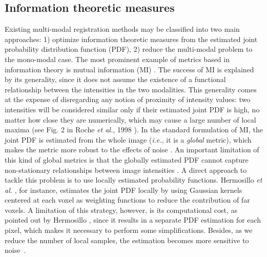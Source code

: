 \subsection{Information theoretic measures}
Existing multi-modal registration methods may be classified into two main approaches: 1) optimize information theoretic measures from the estimated joint probability distribution function (PDF), 2) reduce the multi-modal problem to the mono-modal case. The most prominent example of metrics based in information theory is mutual information (MI) \cite{Maes1997, Mattes2003}. The success of MI is explained by its generality, since it does not assume the existence of a functional relationship between the intensities in the two modalities. This generality comes at the expense of disregarding any notion of proximity of intensity values: two intensities will be considered similar only if their estimated joint PDF is high, no matter how close they are numerically, which may cause a large number of local maxima (see Fig. 2 in Roche {\it et al.}, 1998 \cite{Roche1998}). In the standard formulation of MI, the joint PDF is estimated from the whole image ({\it i.e.}, it is a {\it global} metric), which makes the metric more robust to the effects of noise \cite{Mattes2003}. An important limitation of this kind of global metrics is that the globally estimated PDF cannot capture non-stationary relationships between image intensities \cite{Hermosillo2004}. A direct approach to tackle this problem is to use locally estimated probability functions. Hermosillo {\it et al.} \cite{Hermosillo2004}, for instance, estimates the joint PDF locally by using Gaussian kernels centered at each voxel as weighting functions to reduce the contribution of far voxels. A limitation of this strategy, however, is its computational cost, as pointed out by Hermosillo \cite{Hermosillo2004}, since it results in a separate PDF estimation for each pixel, which makes it necessary to perform some simplifications. Besides, as we reduce the number of local samples, the estimation becomes more sensitive to noise~\cite{Mattes2003}.

\vspace{-0.2cm}
